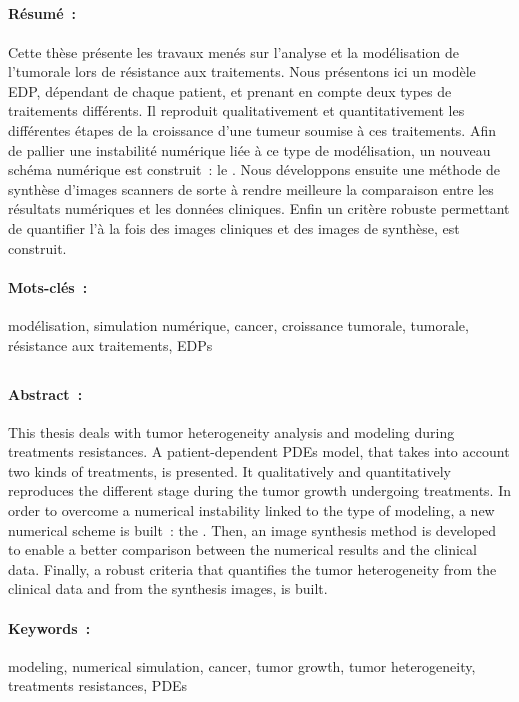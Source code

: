 \documentclass[main.tex]{subfiles}
\begin{document}
\subsection*{\titrefr}
\vfill
\paragraph{Résumé~:} Cette thèse présente les travaux menés sur l'analyse et la modélisation de l'\hetero tumorale lors de résistance aux traitements. 
Nous présentons ici un modèle EDP, dépendant de chaque patient, et prenant en compte deux types de traitements différents. Il reproduit qualitativement et quantitativement les différentes étapes de la croissance d'une tumeur soumise à ces traitements. Afin de pallier une instabilité numérique liée à ce type de modélisation, un nouveau schéma numérique est construit~: le \twinweno. 
Nous développons ensuite une méthode de synthèse d'images scanners de sorte à rendre meilleure la comparaison entre les résultats numériques et les données cliniques.  
Enfin un critère robuste permettant de quantifier l'\hetero à la fois des images cliniques et des images de synthèse, est construit. 

\paragraph{Mots-clés~:} modélisation, simulation numérique, cancer, croissance tumorale, \hetero tumorale, résistance aux traitements, EDPs

\vfill
\myhrule
\vfill

\subsection*{\titreen}
\vfill
\paragraph{Abstract~:} This thesis deals with tumor heterogeneity analysis and modeling during treatments resistances. 
A patient-dependent PDEs model, that takes into account two kinds of treatments, is presented. It qualitatively and quantitatively reproduces the different stage during the tumor growth undergoing treatments. In order to overcome a numerical instability linked to the type of modeling, a new numerical scheme is built~: the \twinweno. 
Then, an image synthesis method is developed to enable a better comparison between the numerical results and the clinical data. 
Finally, a robust criteria that quantifies the tumor heterogeneity from the clinical data and from the synthesis images, is built. 

\paragraph{Keywords~:} modeling, numerical simulation, cancer, tumor growth, tumor heterogeneity, treatments resistances, PDEs
\end{document}
